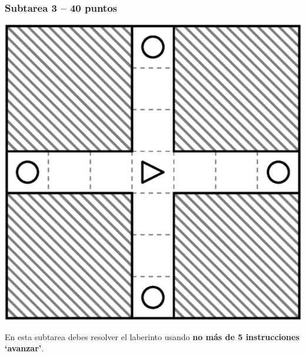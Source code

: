 \documentclass{oci}
\begin{document}
\subsubsection*{Subtarea 3 -- 40 puntos}
\begin{minipage}{0.5\linewidth}
  \centering
\includegraphics[scale=0.5]{laberintos/Subtarea3.eps}
\end{minipage}
\begin{minipage}{0.45\linewidth}
En esta subtarea debes resolver el laberinto usando \textbf{no más de 5 instrucciones `avanzar'}.
\end{minipage}


\end{document}
